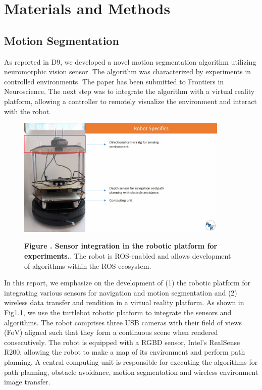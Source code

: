 \chapter{Materials and Methods}

\section{Motion Segmentation }
As reported in D9, we developed a novel motion segmentation algorithm utilizing neuromorphic vision sensor. The algorithm was characterized by experiments in controlled environments. The paper has been submitted to Frontiers in Neuroscience. The next step was to integrate the algorithm with a virtual reality platform, allowing a controller to remotely visualize the environment and interact with the robot.
\begin{figure}[h!]
  \begin{center}
    \includegraphics[width=0.90\textwidth]{figures/motion-seg/setup}%
  \end{center}
  \textbf{\label{fig:turtle_setup} Figure . Sensor integration in the robotic platform for experiments.}. { The robot is ROS-enabled and allows development of algorithms within the ROS ecosystem. }
\end{figure}

In this report, we emphasize on the development of (1) the robotic platform for integrating various sensors for navigation and motion segmentation and (2) wireless data transfer and rendition in a virtual reality platform. As shown in Fig\ref{fig:turtle_setup}, we use the turtlebot robotic platform to integrate the sensors and algorithms. The robot comprises three USB cameras with their field of views (FoV) aligned such that they form a continuous scene when rendered consecutively. The robot is equipped with a RGBD sensor, Intel's RealSense R200, allowing the robot to make a map of its environment and perform path planning. A central computing unit is responsible for executing the algorithms for path planning, obstacle avoidance, motion segmentation and wireless environment image transfer.

